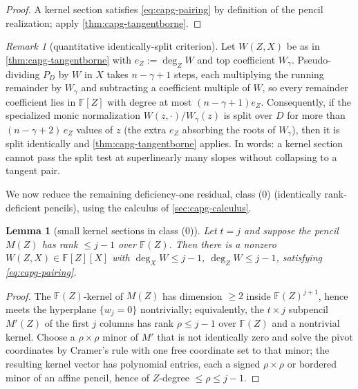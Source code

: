\documentclass[11pt]{article}
\newtheorem{lemma}[lemma]{Lemma}
\theoremstyle{definition}
\theoremstyle{remark}
\newtheorem{remark}[remark]{Remark}
\newcommand{\F}{\mathbb{F}}
\begin{document}
\begin{proof}
A kernel section satisfies \eqref{eq:capg-pairing} by definition of the
pencil realization; apply \cref{thm:capg-tangentborne}.
\end{proof}

\begin{remark}[quantitative identically-split criterion]\label{rem:capg-quantsplit}
Let $W(Z,X)$ be as in \cref{thm:capg-tangentborne} with
$e_Z:=\deg_Z W$ and top coefficient $W_\gamma$.  Pseudo-dividing $P_D$ by
$W$ in $X$ takes $n-\gamma+1$ steps, each multiplying the running remainder
by $W_\gamma$ and subtracting a coefficient multiple of $W$, so every
remainder coefficient lies in $\F[Z]$ with degree at most
$(n-\gamma+1)e_Z$.  Consequently, if the specialized monic normalization
$W(z,\cdot)/W_\gamma(z)$ is split over $D$ for more than
$(n-\gamma+2)\,e_Z$ values of $z$ (the extra $e_Z$ absorbing the roots of
$W_\gamma$), then it is split identically and
\cref{thm:capg-tangentborne} applies.  In words: a kernel section cannot pass
the split test at superlinearly many slopes without collapsing to a tangent
pair.
\end{remark}

We now reduce the remaining deficiency-one residual, class (0)
(identically rank-deficient pencils), using the calculus of
\cref{sec:capg-calculus}.

\begin{lemma}[small kernel sections in class (0)]\label{lem:capg-class0-section}
Let $t=j$ and suppose the pencil $M(Z)$ has rank $\leq j-1$ over $\F(Z)$.
Then there is a nonzero $W(Z,X)\in\F[Z][X]$ with $\deg_XW\leq j-1$,
$\deg_ZW\leq j-1$, satisfying \eqref{eq:capg-pairing}.
\end{lemma}

\begin{proof}
The $\F(Z)$-kernel of $M(Z)$ has dimension $\geq 2$ inside
$\F(Z)^{j+1}$, hence meets the hyperplane $\{w_j=0\}$ nontrivially;
equivalently, the $t\times j$ subpencil $M'(Z)$ of the first $j$ columns has
rank $\rho\leq j-1$ over $\F(Z)$ and a nontrivial kernel.  Choose a
$\rho\times\rho$ minor of $M'$ that is not identically zero and solve the
pivot coordinates by Cramer's rule with one free coordinate set to that
minor; the resulting kernel vector has polynomial entries, each a signed
$\rho\times\rho$ or bordered minor of an affine pencil, hence of $Z$-degree
$\leq\rho\leq j-1$.
\end{proof}
\end{document}
